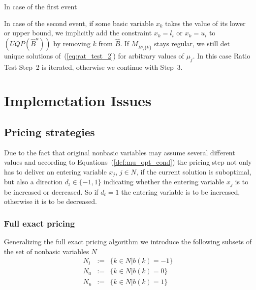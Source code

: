 \documentclass[a4paper]{article}
\begin{document}
In case of the first event

In case of the second event, if some basic variable $x_{k}$ takes the value of
its lower or upper bound, we implicitly add the constraint $x_{k}=l_{i}$ or
$x_{k}=u_{i}$ to $(UQP(\hat{B}^{u}))$ by removing $k$ from $\hat{B}$. If
$M_{\hat{B}\setminus \{k\}}$ stays regular, we still det unique solutions
of~(\ref{eq:rat_test_2})
for arbitrary values of $\mu_{j}$. In this case Ratio Test Step~2 is iterated,
otherwise we continue with Step~3.  
 
\section{Implemetation Issues}
\subsection{Pricing strategies}
Due to the fact that original nonbasic variables may assume several different values and according to Equations~(\ref{def:mu_opt_cond}) the pricing step not only has to deliver an entering variable $x_{j}$, $j \in N$, if the current solution is suboptimal, but also a direction $d_{t} \in \{-1,1\}$ indicating whether the entering variable $x_{j}$ is to be increased or decreased. So if $d_{t}=1$ the entering variable is to be increased, otherwise it is to be decreased.

\subsubsection{Full exact pricing}
Generalizing the full exact pricing algorithm we introduce the following subsets of the set of nonbasic variables $N$
\begin{eqnarray}
N_{l}&:=&\{k \in N\left|\right. b\left(k\right)=-1\} \\
N_{0}&:=&\{k \in N\left|\right. b\left(k\right)=0\} \\
N_{u}&:=&\{k \in N\left|\right. b\left(k\right)=1\}
\end{eqnarray}
\end{document}

